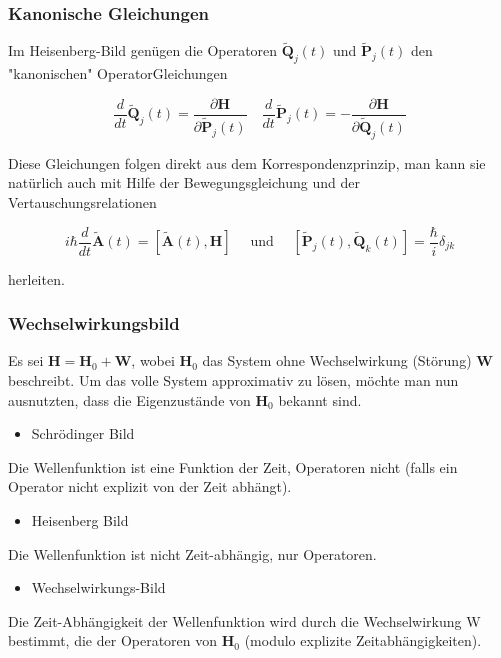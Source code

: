 \documentclass[10pt, letterpaper]{article}
\begin{document}
\subsubsection*{Kanonische Gleichungen}
Im Heisenberg-Bild genügen die Operatoren $\tilde{\mathbf{Q}}_{j}(t)$ und $\tilde{\mathbf{P}}_{j}(t)$ den "kanonischen" OperatorGleichungen

$$
\frac{d}{d t} \tilde{\mathbf{Q}}_{j}(t)=\frac{\partial \mathbf{H}}{\partial \tilde{\mathbf{P}}_{j}(t)} \quad \frac{d}{d t} \tilde{\mathbf{P}}_{j}(t)=-\frac{\partial \mathbf{H}}{\partial \tilde{\mathbf{Q}}_{j}(t)}
$$

Diese Gleichungen folgen direkt aus dem Korrespondenzprinzip, man kann sie natürlich auch mit Hilfe der Bewegungsgleichung und der Vertauschungsrelationen

$$
i \hbar \frac{d}{d t} \tilde{\mathbf{A}}(t)=[\tilde{\mathbf{A}}(t), \mathbf{H}] \quad \text { und } \quad\left[\tilde{\mathbf{P}}_{j}(t), \tilde{\mathbf{Q}}_{k}(t)\right]=\frac{\hbar}{i} \delta_{j k}
$$

herleiten.

\subsubsection*{Wechselwirkungsbild}
Es sei $\mathbf{H}=\mathbf{H}_{0}+\mathbf{W}$, wobei $\mathbf{H}_{0}$ das System ohne Wechselwirkung (Störung) $\mathbf{W}$ beschreibt. Um das volle System approximativ zu lösen, möchte man nun ausnutzten, dass die Eigenzustände von $\mathbf{H}_{0}$ bekannt sind.

\begin{itemize}
  \item Schrödinger Bild
\end{itemize}

Die Wellenfunktion ist eine Funktion der Zeit, Operatoren nicht (falls ein Operator nicht explizit von der Zeit abhängt).

\begin{itemize}
  \item Heisenberg Bild
\end{itemize}

Die Wellenfunktion ist nicht Zeit-abhängig, nur Operatoren.

\begin{itemize}
  \item Wechselwirkungs-Bild
\end{itemize}

Die Zeit-Abhängigkeit der Wellenfunktion wird durch die Wechselwirkung W bestimmt, die der Operatoren von $\mathbf{H}_{0}$ (modulo explizite Zeitabhängigkeiten).
\end{document}
